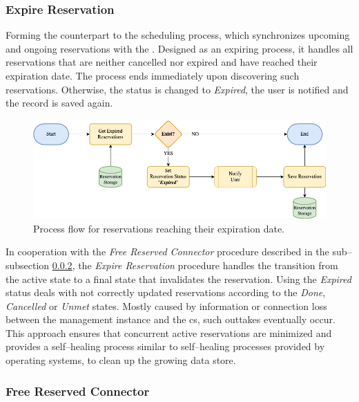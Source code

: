 \subsubsection{Expire Reservation}
\label{ch:Design:sec:Reservation System:ssec:Scheduling Capabilities:sssec:Expire Reservation}

Forming the counterpart to the scheduling process, which synchronizes upcoming and ongoing reservations with the . Designed as an expiring process, it handles all reservations that are neither cancelled nor expired and have reached their expiration date.
The process ends immediately upon discovering such reservations. Otherwise, the status is changed to \textit{Expired}, the user is notified and the record is saved again.

\begin{figure}[h]
    \centering
    \includegraphics[scale=0.4]{resources/images/main/5_design/processes/scheduler/UpdateExpiredReservations.png}
    \caption{Process flow for reservations reaching their expiration date.}
    \label{fig:expire-reservation-flowchart}
\end{figure}

\noindent In cooperation with the \textit{Free Reserved Connector} procedure described in the sub--subsection \ref{ch:Design:sec:Reservation System:ssec:Scheduling Capabilities:sssec:Free Reserved Connector}, the \textit{Expire Reservation} procedure handles the transition from the active state to a final state that invalidates the reservation.
Using the \textit{Expired} status deals with not correctly updated reservations according to the \textit{Done}, \textit{Cancelled} or \textit{Unmet} states. 
Mostly caused by information or connection loss between the management instance and the \acrshort{cs}, such outtakes eventually occur.
This approach ensures that concurrent active reservations are minimized and provides a self--healing process similar to self--healing processes provided by operating systems, to clean up the growing data store.

\subsubsection{Free Reserved Connector}
\label{ch:Design:sec:Reservation System:ssec:Scheduling Capabilities:sssec:Free Reserved Connector}

